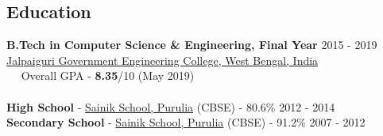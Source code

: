 \documentclass[margin, centered, a4paper]{res}
\begin{document}
\begin{resume}

\section{Education}
\textbf{B.Tech in Computer Science \& Engineering, Final Year} \hfill 2015 - 2019 \\
\href{http://jgec.ac.in/}{Jalpaiguri Government Engineering College, West Bengal, India} \\
~\textbullet~ Overall GPA - \textbf{8.35}/10 (May 2019)
\\
\\
\textbf{High School} - \href{http://sainikschoolpurulia.com/}{Sainik School, Purulia} (CBSE) - 80.6\% \hfill 2012 - 2014 \\
\textbf{Secondary School} - \href{http://sainikschoolpurulia.com/}{Sainik School, Purulia} (CBSE) - 91.2\% \hfill 2007 - 2012


\end{resume}
\end{document}

